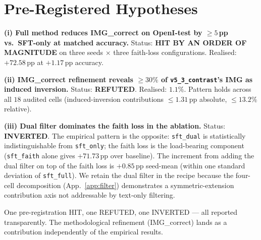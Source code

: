 \documentclass{article}
\begin{document}
\section{Pre-Registered Hypotheses}
\label{app:prereg}

\textbf{(i) Full method reduces IMG\_correct on OpenI-test by
$\geq 5$\,pp vs.\ SFT-only at matched accuracy.} Status:
\textbf{HIT BY AN ORDER OF MAGNITUDE} on three seeds $\times$ three
faith-loss configurations. Realised: $+72.58$\,pp at $+1.17$\,pp
accuracy.

\textbf{(ii) IMG\_correct refinement reveals $\geq 30\%$ of
\texttt{v5\_3\_contrast}'s IMG as induced inversion.} Status:
\textbf{REFUTED}. Realised: $1.1\%$. Pattern holds across all $18$
audited cells (induced-inversion contributions $\leq 1.31$\,pp
absolute, $\leq 13.2\%$ relative).

\textbf{(iii) Dual filter dominates the faith loss in the ablation.}
Status: \textbf{INVERTED}. The empirical pattern is the opposite:
\texttt{sft\_dual} is statistically indistinguishable from
\texttt{sft\_only}; the faith loss is the load-bearing component
(\texttt{sft\_faith} alone gives $+71.73$\,pp over baseline). The
increment from adding the dual filter on top of the faith loss is
$+0.85$\,pp seed-mean (within one standard deviation of
\texttt{sft\_full}). We retain the dual filter in the recipe because
the four-cell decomposition (App.~\ref{app:filter}) demonstrates a
symmetric-extension contribution axis not addressable by text-only
filtering.

One pre-registration HIT, one REFUTED, one INVERTED --- all reported
transparently. The methodological refinement (IMG\_correct) lands as a
contribution independently of the empirical results.
\end{document}
